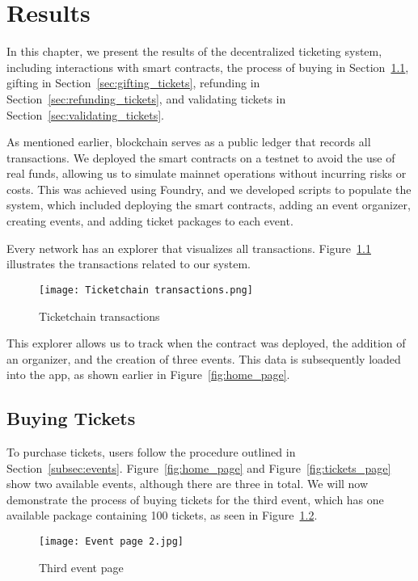 \chapter{Results}\label{ch:results}

In this chapter, we present the results of the decentralized ticketing system,
including interactions with smart contracts, the process of buying in
Section~\ref{sec:buying_tickets}, gifting in Section~\ref{sec:gifting_tickets},
refunding in Section~\ref{sec:refunding_tickets}, and validating tickets in
Section~\ref{sec:validating_tickets}.

As mentioned earlier, blockchain serves as a public ledger that records all
transactions. We deployed the smart contracts on a testnet to avoid the use of
real funds, allowing us to simulate mainnet operations without incurring risks
or costs. This was achieved using Foundry, and we developed scripts to populate
the system, which included deploying the smart contracts, adding an event
organizer, creating events, and adding ticket packages to each event.

Every network has an explorer that visualizes all transactions.
Figure~\ref{fig:ticketchain_transactions} illustrates the transactions related
to our system.
\begin{figure}[H]
    \texttt{[image: Ticketchain transactions.png]}
    \centering
    \caption{Ticketchain transactions}\label{fig:ticketchain_transactions}
\end{figure}

This explorer allows us to track when the contract was deployed, the addition
of an organizer, and the creation of three events. This data is subsequently
loaded into the app, as shown earlier in Figure~\ref{fig:home_page}.

\section{Buying Tickets}\label{sec:buying_tickets}

To purchase tickets, users follow the procedure outlined in
Section~\ref{subsec:events}. Figure~\ref{fig:home_page} and
Figure~\ref{fig:tickets_page} show two available events, although there are
three in total. We will now demonstrate the process of buying tickets for the
third event, which has one available package containing 100 tickets, as seen in
Figure~\ref{fig:buy_tickets_event}.

\begin{figure}[H]
    \texttt{[image: Event page 2.jpg]}
    \centering
    \caption{Third event page}\label{fig:buy_tickets_event}
\end{figure}


